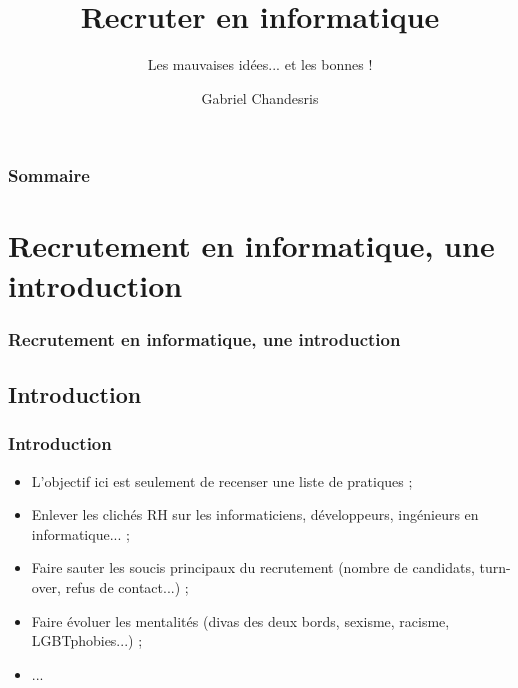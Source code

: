 \documentclass[slidetop,11pt]{beamer}
\title{Recruter en informatique}
\subtitle{Les mauvaises id{\'e}es... et les bonnes !}
\author{Gabriel Chandesris}
\institute{\emph{Data Engineer / Dev Senior / ...}}
\begin{document}
%


\begin{frame}
	\frametitle{Sommaire}
	\small \tableofcontents[hideallsubsections]
\end{frame} 

\section{Recrutement en informatique, une introduction}
\begin{frame}
	\frametitle{Recrutement en informatique, une introduction}
	\tableofcontents[sections=1,currentsection,subsectionstyle=show/shaded/hide] %
\end{frame}

\subsection{Introduction}
\begin{frame}
	\frametitle{Introduction}
	\begin{itemize}
		\item L'objectif ici est seulement de recenser une liste de pratiques ; 
		\item Enlever les clich{\'e}s RH sur les informaticiens, d{\'e}veloppeurs, ing{\'e}nieurs en informatique... ; 
		\item Faire sauter les soucis principaux du recrutement (nombre de candidats, turn-over, refus de contact...) ;
		\item Faire {\'e}voluer les mentalit{\'e}s (divas des deux bords, sexisme, racisme, LGBTphobies...) ; 
		\item ...  
	\end{itemize}
\end{frame}
\end{document}
